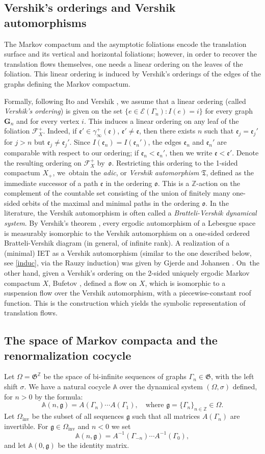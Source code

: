 \documentclass[11pt]{article}
\newcommand{\Subsection}{\subsection}
\numberwithin{equation}{section}\newcommand{\Relation}[2][]{}\newtheorem*{prop*}{Proposition}
\let\mathcal\mathscr
\newcommand{\inv}{\mathrm{inv}}
\theoremstyle{plain}
\theoremstyle{definition}
\newcommand \G {{\boldsymbol G}}
\let\gam\gamma
\let\Om\Omega
\let\Gam\Gamma
\let\sig\sigma
\newcommand\ef{\mathfrak{e}}
\newcommand\gf{\mathfrak{g}}
\newcommand\ok{\mathfrak{o}}
\newcommand\Frg{\mathfrak{G}}
\newcommand{\Ek}{\mathcal{E}}
\newcommand{\Fk}{\mathcal{F}}
\newcommand\Aa{\mathbb{A}}
\newcommand{\Z}{\mathbb{Z}}
\begin{document}
\subsection{Vershik's orderings and Vershik automorphisms}
The Markov compactum and the asymptotic foliations encode the translation surface and its vertical and horizontal foliations; however, in order to recover the translation flows themselves, one needs a linear ordering on the leaves of the foliation. This linear ordering is induced by Vershik's orderings of the edges of the graphs defining the Markov compactum.

Formally, following Ito \cite{Ito} and Vershik \cite{Vershik1,Vershik2}, we assume that a linear ordering (called \emph{Vershik's ordering}) is given on the set $\{e\in \Ek(\Gam_n): I(e)=i\}$ for every graph~$\G_n$ and for every vertex $i$. This induces a linear ordering on any leaf of the foliation $\Fk_X^+$. Indeed, if $\ef' \in \gam_\infty^+(\ef)$, $\ef'\ne \ef$, then there exists $n$ such that $\ef_j = \ef_j'$ for $j>n$ but $\ef_j \ne \ef_j'$. Since $I(\ef_n) = I(\ef_n')$, the edges $\ef_n$ and $\ef_n'$ are comparable with respect to our ordering; if $\ef_n < \ef_n'$, then we write $\ef< \ef'$.
Denote the resulting ordering on $\Fk_X^+$ by~$\ok$.
Restricting this ordering to the 1-sided compactum $X_+$, we~obtain the \emph{adic}, or \emph{Vershik automorphism}
$\mathfrak{T}$, defined as the immediate successor of a path $\ef$ in the ordering $\ok$. This is a $\Z$-action on the complement of the countable set consisting of the union of finitely many one-sided orbits of the maximal and minimal paths in the ordering $\ok$. In the literature, the Vershik automorphism is often called a \emph{Bratteli-Vershik dynamical system}.
By Vershik's theorem \cite{Vershik1,Vershik2}, every ergodic automorphism of a Lebesgue space is measurably isomorphic to the Vershik automorphism on a one-sided ordered Bratteli-Vershik diagram (in general, of infinite rank). A realization of a (minimal) IET as a Vershik automorphism (similar to the one described below, see \eqref{induc}, via the Rauzy induction) was given by Gjerde and Johansen \cite{GJ}. On~the other hand, given a Vershik's ordering on the 2-sided uniquely ergodic Markov compactum $X$, Bufetov \cite{Buf-umn}, defined a flow on $X$, which is isomorphic to a suspension flow over the Vershik automorphism, with a piecewise-constant roof function. This is the construction which yields the symbolic representation of translation flows.

\Subsection{The space of Markov compacta and the renormalization cocycle} Let $\Om=\Frg^\Z$ be the space of bi-infinite sequences of graphs $\Gam_n \in \Frg$, with the left shift
$\sig$. We have a natural cocycle $\Aa$ over the dynamical system $(\Om,\sig)$ defined, for $n>0$ by the formula:
\[
\Aa(n,\gf) = A(\Gam_n)\cdots A(\Gam_1),\quad \text{where } \gf = \{\Gam_n\}_{n\in \Z}\in \Om.
\]
Let $\Om_{\inv}$ be the subset of all sequences $\gf$ such that all matrices $A(\Gam_n)$ are invertible. For $\gf\in \Om_{\inv}$ and $n<0$ we set
\[
\Aa(n,\gf) = A^{-1}(\Gam_{-n})\cdots A^{-1}(\Gam_0),
\]
and let $\Aa(0,\gf)$ be the identity matrix.
\end{document}
